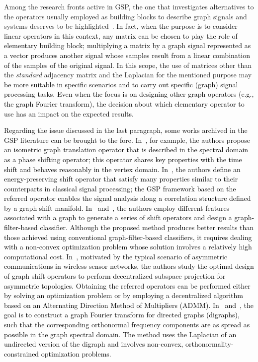 Among the research fronts active in GSP, the one that investigates alternatives to the operators usually employed as building blocks to describe graph signals and systems deserves to be highlighted~\cite{girault2015translation,gavili2017,fan20191,fan2019,mollaebrahim2021,shafipour2018,shafipour2019}. \textcolor{black}{In fact, when the purpose is to consider linear operators in this context, any matrix can be chosen to play the role of elementary building block; multiplying a matrix by a graph signal represented as a vector produces another signal whose samples result from a linear combination of the samples of the original signal. In this scope,} the use of matrices other than the \textit{standard} adjacency matrix and the Laplacian for the mentioned purpose may \textcolor{black}{be more suitable in specific scenarios and to carry out specific (graph) signal processing tasks. Even when the focus is on designing other graph operators (e.g., the graph Fourier transform), the decision about which elementary operator to use has an impact on the expected results.}

\textcolor{black}{Regarding the issue discussed in the last paragraph, some works archived in the GSP literature can be brought to the fore. In~\cite{girault2015translation}, for example, the authors propose an isometric graph translation operator that is described in the spectral domain as a phase shifting operator; this operator shares key properties with the time shift and behaves reasonably in the vertex domain. In~\cite{gavili2017}, the authors define an energy-preserving shift operator that satisfy many properties similar to their counterparts in classical signal processing; the GSP framework based on the referred operator enables the signal analysis along a correlation structure defined by a graph shift manifold. In~\cite{fan20191} and~\cite{fan2019}, the authors employ different features associated with a graph to generate a series of shift operators and design a graph-filter-based classifier. Although the proposed method produces better results than those achieved using conventional graph-filter-based classifiers, it requires dealing with a non-convex optimization problem whose solution involves a relatively high computational cost. In~\cite{mollaebrahim2021}, motivated by the typical scenario of asymmetric communications in wireless sensor networks, the authors study the optimal design of graph shift operators to perform decentralized subspace projection for asymmetric topologies. Obtaining the referred operators can be performed either by solving an optimization problem or by employing a decentralized algorithm based on an Alternating Direction Method of Multipliers (ADMM). In~\cite{shafipour2018} and~\cite{shafipour2019}, the goal is to construct a graph Fourier transform for directed graphs (digraphs), such that the corresponding orthonormal frequency components are as spread as possible in the graph spectral domain. The method uses the Laplacian of an undirected version of the digraph and involves non-convex, orthonormality-constrained optimization problems.} 

